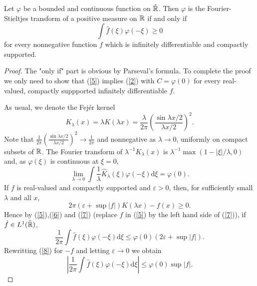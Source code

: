 \begin{theorem}
  Let $\varphi$ be a bounded and continuous function on $\hat{\mathbb{R}}$. Then $\varphi$ is the Fourier-Stieltjes transform of a positive measure on $\mathbb{R}$ if and only if 
  \begin{equation}
    \int \hat{f}(\xi)\varphi(-\xi)\ge 0 \label{5}
  \end{equation}for every nonnegative function $f$ which is infinitely differentiable and compactly supported.
\end{theorem}
\begin{proof}
  The "only if" part is obvious by Parseval's formula. To complete the proof we only need to show that (\ref{5}) implies (\ref{2}) with $C=\varphi(0)$ for every real-valued, compactly suppported infinitely differentiable $f$.

  As usual, we denote the Fej\'{e}r kernel
  \[
    K_\lambda(x)=\lambda K(\lambda x)=\frac{\lambda}{2\pi}\left( \frac{\sin \lambda x/2}{\lambda x /2} \right) ^2 .
  \] 
  Note that $\frac{1}{2\pi}\left( \frac{\sin \lambda x /2}{\lambda x /2} \right) ^2\to \frac{1}{2\pi}$ and nonnegative as $\lambda\to 0$, uniformly on compact subsets of $\mathbb{R}$. The Fourier transform of $\lambda^{-1}K_\lambda(x)$ is $\lambda^{-1}\max\left( 1-|\xi| /\lambda, 0 \right) $ and, as $\varphi(\xi)$ is continuous at $\xi=0$,
  \begin{equation}
    \lim_{\lambda\to 0}\int \frac{1}{\lambda}\hat{K}_\lambda(\xi)\varphi(-\xi)\mathrm{d}\xi=\varphi(0).\label{6}
  \end{equation}
If $f$ is real-valued and compactly supported and $\varepsilon >0$, then, for sufficiently small $\lambda$ and all $x$,
\begin{equation}
  2\pi (\varepsilon +\sup |f|)K(\lambda x)-f(x)\ge 0.\label{7}
\end{equation}
Hence by (\ref{5}),(\ref{6}) and (\ref{7}) (replace $f$ in (\ref{5}) by the left hand side of (\ref{7})), if $\hat{f}\in L^{1}(\hat{\mathbb{R}})$,
\begin{equation}
  \frac{1}{2\pi} \int \hat{f}(\xi)\varphi(-\xi)\mathrm{d}\xi\le \varphi(0)\left( 2\varepsilon +\sup|f| \right).\label{8} 
\end{equation} 
Rewritting (\ref{8}) for $-f$ and letting $\varepsilon \to 0$ we obtain
\begin{equation}
  \left| \frac{1}{2\pi}\int \hat{f}(\xi)\varphi(-\xi)\mathrm{d}\xi \right| \le \varphi(0)\sup|f|.
\end{equation}
\end{proof}

